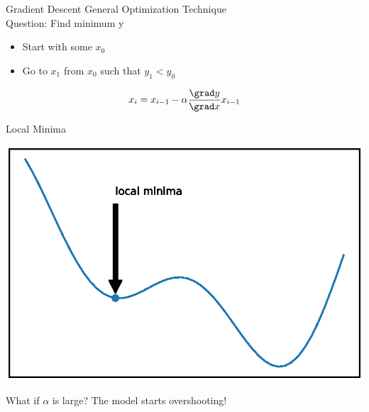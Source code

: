 \documentclass{beamer}
\begin{document}
\begin{frame}{Gradient Descent}
    General Optimization Technique\\
    Question: Find minimum y
    \begin{itemize}
        \item Start with some $x_{0}$
        \item Go to $x_{1}$ from $x_{0} $ such that $y_{1}< y_{0}$
    \end{itemize}
    
    \begin{equation*}
        x_{i} = x_{i-1} - \alpha\frac{\grad y }{\grad x} x_{i-1}
    \end{equation*}
    
\end{frame}

\begin{frame}{Local Minima}
      \begin{center}
       \includegraphics[totalheight=6cm]{gradient-descent/local-minima.eps}
   \end{center}
\end{frame}




\begin{frame}{What if $\alpha$ is large?}
    The model starts overshooting!
\end{frame}
\end{document}
